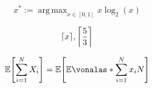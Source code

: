 \documentclass{article}
\DeclareMathOperator*{\argmax}{arg\,max}
\DeclarePairedDelimiter{\ceil}{\lceil}{\rceil}
\DeclarePairedDelimiter{\szogletes}{[}{]}
\newcommand{\VE}[1]{\mathbb{E}\szogletes*{#1}}
\newcommand{\FVE}[2]{\mathbb{E}\vonalas*{#1}{#2}}
\begin{document}
	\[x^* := \argmax_{x\in[0, 1]} x \log_2(x)\]
	
	\[\ceil{x}, \ceil*{\frac{5}{3}}\]
	
	\[\VE{\sum_{i=1}^{N}{X_i}} = \VE{\FVE{\sum_{i=1}^{N}{x_i}}{N}}\]
	
	
	
	
\end{document}
